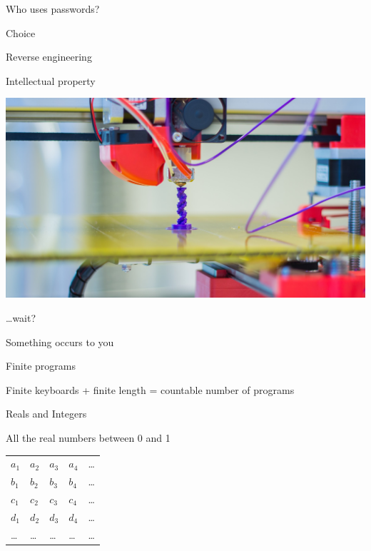 \documentclass[presentation]{beamer}
\begin{document}
\begin{frame}[label={sec:org3aa09b8}]{Who uses passwords?}
\begin{block}{}
\end{block}
\end{frame}
\begin{frame}[label={sec:org7667ee8}]{Choice}
\end{frame}
\begin{frame}[label={sec:org7047978}]{Reverse engineering}
\end{frame}
\begin{frame}[label={sec:org275239c}]{Intellectual property}
\begin{center}
\includegraphics[width=.9\linewidth]{Felix_3D_Printer_-_Printing_Head.JPG}
\end{center}
\end{frame}
\begin{frame}[label={sec:org0e6d1fc}]{\ldots{}wait?}
\begin{block}{}
Something occurs to you
\end{block}
\end{frame}
\begin{frame}[label={sec:orge643353}]{Finite programs}
\begin{block}{}
Finite keyboards + finite length = countable number of programs
\end{block}
\end{frame}
\begin{frame}[label={sec:orgadc44d3}]{Reals and Integers}
\begin{block}{All the real numbers between 0 and 1}
\begin{center}
\begin{tabular}{lllll}
\(a_1\) & \(a_2\) & \(a_3\) & \(a_4\) & \ldots{}\\
\(b_1\) & \(b_2\) & \(b_3\) & \(b_4\) & \ldots{}\\
\(c_1\) & \(c_2\) & \(c_3\) & \(c_4\) & \ldots{}\\
\(d_1\) & \(d_2\) & \(d_3\) & \(d_4\) & \ldots{}\\
\ldots{} & \ldots{} & \ldots{} & \ldots{} & \ldots{}\\
\end{tabular}
\end{center}
\end{block}
\end{frame}
\end{document}
